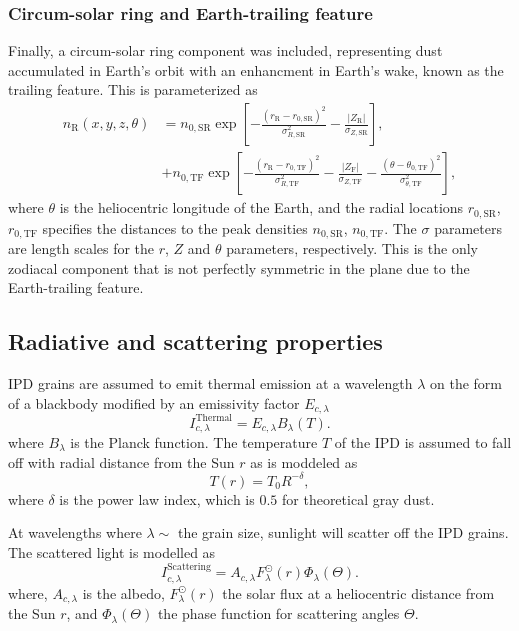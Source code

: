 \documentclass{aa}
\begin{document}
\subsubsection{Circum-solar ring and Earth-trailing feature}
Finally, a circum-solar ring component was included, representing dust accumulated in Earth's orbit with an enhancment in Earth's wake, known as the trailing feature. This is parameterized as
\begin{align}
    n_\mathrm{R}(x, y, z, \theta)&=n_{0, \mathrm{SR}} \exp \left[-\frac{\left(r_\mathrm{R}-r_{0, \mathrm{SR}}\right)^2}{\sigma_{R,\mathrm{SR}} ^2}-\frac{\left| Z_\mathrm{R} \right|}{\sigma_{Z, \mathrm{SR}}}\right],\\
   &+ n_{0, \mathrm{TF}} \exp \left[-\frac{\left(r_\mathrm{R}-r_{0, \mathrm{TF}}\right)^{2}}{\sigma_{R, \mathrm{TF}}^{2}}-\frac{\left|Z_\mathrm{F}\right|}{\sigma_{Z, \mathrm{TF}}}-\frac{\left(\theta-\theta_{0, \mathrm{TF}}\right)^{2}}{\sigma_{\theta,\mathrm{TF}}^{2}}\right],
\end{align}
where $\theta$ is the heliocentric longitude of the Earth, and the radial locations $r_{0, \mathrm{SR}}$, $r_{0, \mathrm{TF}}$ specifies the distances to the peak densities $n_{0, \mathrm{SR}}$, $n_{0, \mathrm{TF}}$. The $\sigma$ parameters are length scales for the $r$, $Z$ and $\theta$ parameters, respectively. This is the only zodiacal component that is not perfectly symmetric in the plane due to the Earth-trailing feature.

\subsection{Radiative and scattering properties}
IPD grains are assumed to emit thermal emission at a wavelength $\lambda$ on the form of a blackbody modified by an emissivity factor $E_{c, \lambda}$
\begin{equation}
    I^\mathrm{Thermal}_{c,\lambda} = E_{c,\lambda} B_\lambda(T).
\end{equation}
where $B_\lambda$ is the Planck function. The temperature $T$ of the IPD is assumed to fall off with radial distance from the Sun $r$ as is moddeled as
\begin{equation}
    T(r) = T_0 R^{-\delta},
\end{equation}
where $\delta$ is the power law index, which is $0.5$ for theoretical gray dust.

At wavelengths where $\lambda \sim$ the grain size, sunlight will scatter off the IPD grains. The scattered light is modelled as 
\begin{equation}\label{eq: scat_term}
    I^\mathrm{Scattering}_{c, \lambda} = A_{c, \lambda} F_\lambda^\odot(r) \Phi_\lambda(\Theta).
\end{equation}
where, $A_{c, \lambda}$ is the albedo,  $F_\lambda^\odot(r)$ the solar flux at a heliocentric distance from the Sun $r$, and $\Phi_\lambda(\Theta)$ the phase function for scattering angles $\Theta$.
\end{document}
